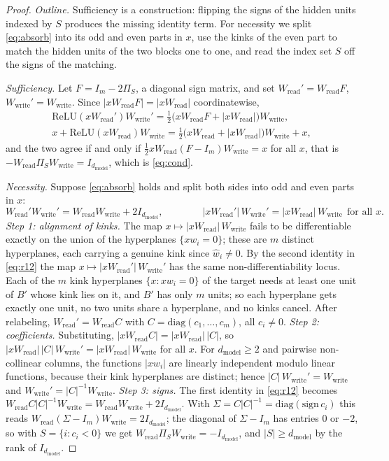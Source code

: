 \documentclass[10pt]{article}
\theoremstyle{definition}
\theoremstyle{remark}
\newcommand{\Wread}{W_{\mathrm{read}}}
\newcommand{\Wwrite}{W_{\mathrm{write}}}
\newcommand{\dm}{d_{\mathrm{model}}}
\begin{document}
\begin{proof}
\emph{Outline.} Sufficiency is a construction: flipping the signs of the hidden units indexed by $S$ produces the missing identity term. For necessity we split \eqref{eq:absorb} into its odd and even parts in $x$, use the kinks of the even part to match the hidden units of the two blocks one to one, and read the index set $S$ off the signs of the matching.

\emph{Sufficiency.} Let $F = I_m - 2\Pi_S$, a diagonal sign matrix, and set $\Wread' = \Wread F$, $\Wwrite' = \Wwrite$. Since $|x\Wread F| = |x\Wread|$ coordinatewise,
\begin{gather*}
\mathrm{ReLU}(x\Wread')\Wwrite' = \tfrac12\big(x\Wread F + |x\Wread|\big)\Wwrite,\\
x + \mathrm{ReLU}(x\Wread)\Wwrite = \tfrac12\big(x\Wread + |x\Wread|\big)\Wwrite + x ,
\end{gather*}
and the two agree if and only if $\tfrac12 x\Wread(F - I_m)\Wwrite = x$ for all $x$, that is $-\Wread\Pi_S\Wwrite = I_{\dm}$, which is \eqref{eq:cond}.

\emph{Necessity.} Suppose \eqref{eq:absorb} holds and split both sides into odd and even parts in $x$:
\begin{equation}\label{eq:r12}
\Wread'\Wwrite' = \Wread\Wwrite + 2I_{\dm},\qquad\qquad |x\Wread'|\,\Wwrite' = |x\Wread|\,\Wwrite\ \ \text{for all } x .
\end{equation}
\emph{Step 1: alignment of kinks.} The map $x \mapsto |x\Wread|\,\Wwrite$ fails to be differentiable exactly on the union of the hyperplanes $\{x w_i = 0\}$; these are $m$ distinct hyperplanes, each carrying a genuine kink since $\hat w_i \neq 0$. By the second identity in \eqref{eq:r12} the map $x \mapsto |x\Wread'|\,\Wwrite'$ has the same non-differentiability locus. Each of the $m$ kink hyperplanes $\{x : x w_i = 0\}$ of the target needs at least one unit of $B'$ whose kink lies on it, and $B'$ has only $m$ units; so each hyperplane gets exactly one unit, no two units share a hyperplane, and no kinks cancel. After relabeling, $\Wread' = \Wread C$ with $C = \mathrm{diag}(c_1, \dots, c_m)$, all $c_i \neq 0$.
\emph{Step 2: coefficients.} Substituting, $|x\Wread C| = |x\Wread|\,|C|$, so $|x\Wread|\,|C|\,\Wwrite' = |x\Wread|\,\Wwrite$ for all $x$. For $\dm \ge 2$ and pairwise non-collinear columns, the functions $|x w_i|$ are linearly independent modulo linear functions, because their kink hyperplanes are distinct; hence $|C|\,\Wwrite' = \Wwrite$ and $\Wwrite' = |C|^{-1}\Wwrite$.
\emph{Step 3: signs.} The first identity in \eqref{eq:r12} becomes $\Wread C|C|^{-1}\Wwrite = \Wread\Wwrite + 2I_{\dm}$. With $\Sigma = C|C|^{-1} = \mathrm{diag}(\mathrm{sign}\,c_i)$ this reads $\Wread(\Sigma - I_m)\Wwrite = 2I_{\dm}$; the diagonal of $\Sigma - I_m$ has entries $0$ or $-2$, so with $S = \{i : c_i < 0\}$ we get $\Wread\Pi_S\Wwrite = -I_{\dm}$, and $|S| \ge \dm$ by the rank of $I_{\dm}$.
\end{proof}
\end{document}
